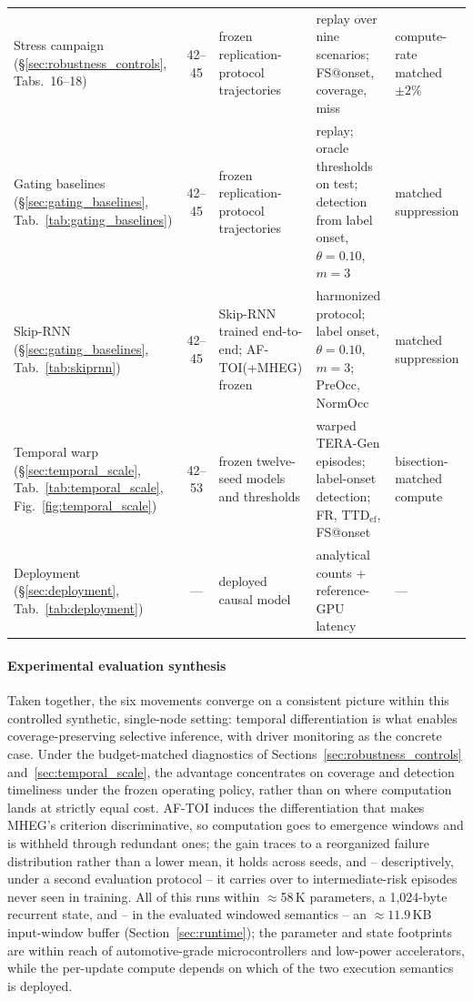 \documentclass[a4paper,fleqn]{cas-dc}
\newcommand{\TERAGen}{\mbox{TERA-Gen}\xspace}
\newcommand{\AFTOI}{\mbox{AF-TOI}\xspace}
\newcommand{\MHEG}{\mbox{MHEG}\xspace}
\begin{document}
\begin{table}[!tbp]
\begin{tabularx}{\textwidth}{>{\raggedright\arraybackslash}p{2.7cm}
  c >{\raggedright\arraybackslash}p{3.0cm} >{\raggedright\arraybackslash}X
  >{\raggedright\arraybackslash}p{2.4cm}}
Stress campaign (\S\ref{sec:robustness_controls},
Tabs.~16--18) & 42--45 & frozen replication-protocol trajectories
  & replay over nine scenarios; FS@onset, coverage, miss
  & compute-rate matched $\pm2\%$ \\
Gating baselines (\S\ref{sec:gating_baselines},
Tab.~\ref{tab:gating_baselines}) & 42--45 & frozen replication-protocol
  trajectories & replay; oracle thresholds on test; detection from label
  onset, $\theta{=}0.10$, $m{=}3$ & matched suppression \\
Skip-RNN (\S\ref{sec:gating_baselines}, Tab.~\ref{tab:skiprnn}) & 42--45
  & Skip-RNN trained end-to-end; \mbox{AF-TOI}(+\MHEG) frozen
  & harmonized protocol; label onset, $\theta{=}0.10$, $m{=}3$; PreOcc,
    NormOcc & matched suppression \\
Temporal warp (\S\ref{sec:temporal_scale}, Tab.~\ref{tab:temporal_scale},
Fig.~\ref{fig:temporal_scale}) & 42--53 & frozen twelve-seed models and thresholds
  & warped \TERAGen episodes; label-onset detection; FR,
    $\mathrm{TTD}_{\mathrm{ef}}$, FS@onset & bisection-matched compute \\
Deployment (\S\ref{sec:deployment}, Tab.~\ref{tab:deployment}) & ---
  & deployed causal model & analytical counts + reference-GPU latency & --- \\
\bottomrule
\end{tabularx}
\end{table}
\paragraph{Experimental evaluation synthesis}
Taken together, the six movements converge on a consistent picture within this controlled synthetic, single-node setting: temporal differentiation is what enables coverage-preserving selective inference, with driver monitoring as the concrete case. {\color{\revcolor}Under the budget-matched diagnostics of Sections~\ref{sec:robustness_controls} and~\ref{sec:temporal_scale}, the advantage concentrates on coverage and detection timeliness under the frozen operating policy, rather than on where computation lands at strictly equal cost.} \AFTOI induces the differentiation that
makes \MHEG's criterion discriminative, so computation goes to emergence windows and
is withheld through redundant ones; the gain traces to a reorganized
failure distribution rather than a lower mean, it holds across seeds, and -- descriptively, under a second evaluation
protocol -- it carries over to intermediate-risk episodes never seen in
training. All of this runs within $\approx$58\,K parameters, a 1,024-byte recurrent
state, and -- in the evaluated windowed semantics -- an ${\approx}11.9$\,KB
input-window buffer (Section~\ref{sec:runtime}); the parameter and state
footprints are within reach of automotive-grade microcontrollers and
low-power accelerators, while the per-update compute depends on which of the
two execution semantics is deployed.
\end{document}
